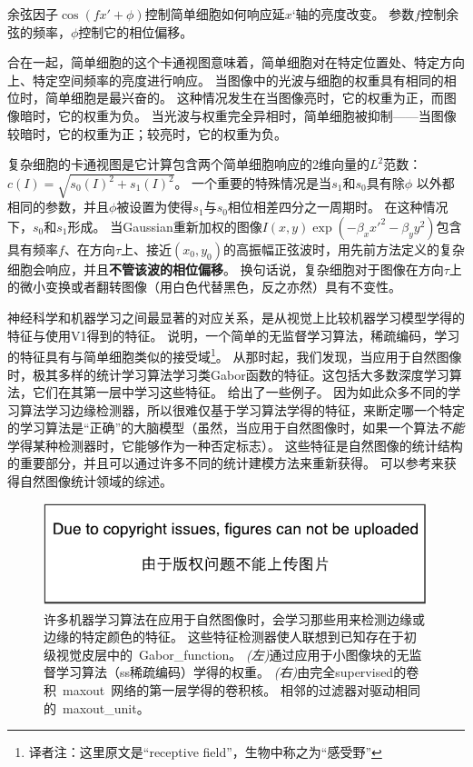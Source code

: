 余弦因子$ \cos (fx' + \phi)$控制简单细胞如何响应延$x‘$轴的亮度改变。
参数$f$控制余弦的频率，$\phi$控制它的相位偏移。

合在一起，简单细胞的这个卡通视图意味着，简单细胞对在特定位置处、特定方向上、特定空间频率的亮度进行响应。
当图像中的光波与细胞的权重具有相同的相位时，简单细胞是最兴奋的。
这种情况发生在当图像亮时，它的权重为正，而图像暗时，它的权重为负。
当光波与权重完全异相时，简单细胞被抑制——当图像较暗时，它的权重为正；较亮时，它的权重为负。
 
 
复杂细胞的卡通视图是它计算包含两个简单细胞响应的2维向量的$L^2$范数：$c(I)=\sqrt{s_0(I)^2 + s_1(I)^2}$。
一个重要的特殊情况是当$s_1$和$s_0$具有除$\phi$ 以外都相同的参数，并且$\phi$被设置为使得$s_1$与$s_0$相位相差四分之一周期时。
在这种情况下，$s_0$和$s_1$形成。
当Gaussian重新加权的图像$I(x,y)\exp(-\beta_x x'^2 -\beta_y y^2)$包含具有频率$f$、在方向$\tau$上、接近$(x_0, y_0)$的高振幅正弦波时，用先前方法定义的复杂细胞会响应，并且\textbf{不管该波的相位偏移}。
换句话说，复杂细胞对于图像在方向$\tau$上的微小变换或者翻转图像（用白色代替黑色，反之亦然）具有不变性。

神经科学和机器学习之间最显著的对应关系，是从视觉上比较机器学习模型学得的特征与使用V1得到的特征。
\cite{Olshausen+Field-1996}说明，一个简单的无监督学习算法，稀疏编码，学习的特征具有与简单细胞类似的接受域\footnote{译者注：这里原文是``receptive field''，生物中称之为``感受野''}。
从那时起，我们发现，当应用于自然图像时，极其多样的统计学习算法学习类Gabor函数的特征。这包括大多数深度学习算法，它们在其第一层中学习这些特征。
给出了一些例子。
因为如此众多不同的学习算法学习边缘检测器，所以很难仅基于学习算法学得的特征，来断定哪一个特定的学习算法是``正确''的大脑模型（虽然，当应用于自然图像时，如果一个算法\emph{不能}学得某种检测器时，它能够作为一种否定标志）。
这些特征是自然图像的统计结构的重要部分，并且可以通过许多不同的统计建模方法来重新获得。
可以参考\citep{hyvarinen-book2009}来获得自然图像统计领域的综述。
\begin{figure}
\ifOpenSource
\centerline{\includegraphics{figure.pdf}}
\else
\centering    
{}     
\fi
\caption{许多机器学习算法在应用于自然图像时，会学习那些用来检测边缘或边缘的特定颜色的特征。 
这些特征检测器使人联想到已知存在于初级视觉皮层中的~\gls{Gabor_function}。   
\emph{(左)}通过应用于小图像块的无监督学习算法（\gls{ss}稀疏编码）学得的权重。%
\emph{(右)}由完全\gls{supervised}的卷积~\gls{maxout}~网络的第一层学得的卷积核。 相邻的过滤器对驱动相同的~\gls{maxout_unit}。}     
\label{fig:chap9_feature_detectors}     
\end{figure}

